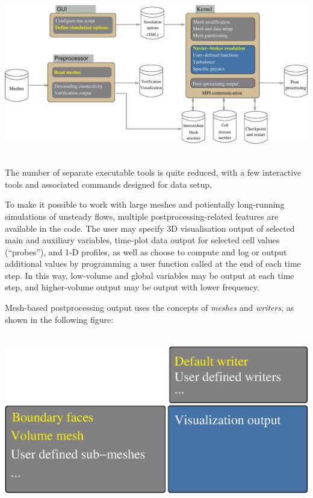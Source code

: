 ~\
\includegraphics[scale=0.2]{pictures/cs_components.eps}
\label{fig:cs_components}
\vspace{+0.04in}
~\

The number of separate executable tools is quite reduced, with a few
interactive tools and associated commands designed for data setup,

To make it possible to work with large meshes and potientally long-running
simulations of unsteady flows, multiple postprocessing-related features
are available in the code. The user may specify 3D visualisation
output of selected main and auxiliary variables, time-plot data output
for selected cell values (``probes''), and 1-D profiles, as well as
choose to compute and log or output additional values by programming
a user function called at the end of each time step.
In this way, low-volume and global variables may be output
at each time step, and higher-volume output may be output with lower
frequency.

Mesh-based postprocessing output uses the concepts of \emph{meshes}
and \emph{writers}, as shown in the following figure:

~\
\includegraphics[scale=0.3]{pictures/cs_post.eps}
\label{fig:cs_post}
\vspace{+0.04in}
~\

